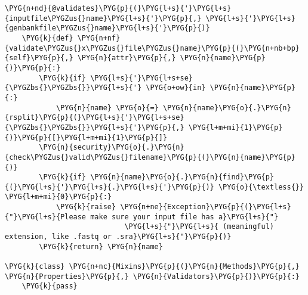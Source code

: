 \begin{Verbatim}[commandchars=\\\{\}]
    \PYG{n+nd}{@validates}\PYG{p}{(}\PYG{l+s}{'}\PYG{l+s}{inputfile\PYGZus{}name}\PYG{l+s}{'}\PYG{p}{,} \PYG{l+s}{'}\PYG{l+s}{genbankfile\PYGZus{}name}\PYG{l+s}{'}\PYG{p}{)}
    \PYG{k}{def} \PYG{n+nf}{validate\PYGZus{}x\PYGZus{}file\PYGZus{}name}\PYG{p}{(}\PYG{n+nb+bp}{self}\PYG{p}{,} \PYG{n}{attr}\PYG{p}{,} \PYG{n}{name}\PYG{p}{)}\PYG{p}{:}
        \PYG{k}{if} \PYG{l+s}{'}\PYG{l+s+se}{\PYGZbs{}\PYGZbs{}}\PYG{l+s}{'} \PYG{o+ow}{in} \PYG{n}{name}\PYG{p}{:}
            \PYG{n}{name} \PYG{o}{=} \PYG{n}{name}\PYG{o}{.}\PYG{n}{rsplit}\PYG{p}{(}\PYG{l+s}{'}\PYG{l+s+se}{\PYGZbs{}\PYGZbs{}}\PYG{l+s}{'}\PYG{p}{,} \PYG{l+m+mi}{1}\PYG{p}{)}\PYG{p}{[}\PYG{l+m+mi}{1}\PYG{p}{]}
        \PYG{n}{security}\PYG{o}{.}\PYG{n}{check\PYGZus{}valid\PYGZus{}filename}\PYG{p}{(}\PYG{n}{name}\PYG{p}{)}
        \PYG{k}{if} \PYG{n}{name}\PYG{o}{.}\PYG{n}{find}\PYG{p}{(}\PYG{l+s}{'}\PYG{l+s}{.}\PYG{l+s}{'}\PYG{p}{)} \PYG{o}{\textless{}} \PYG{l+m+mi}{0}\PYG{p}{:}
            \PYG{k}{raise} \PYG{n+ne}{Exception}\PYG{p}{(}\PYG{l+s}{"}\PYG{l+s}{Please make sure your input file has a}\PYG{l+s}{"}
                            \PYG{l+s}{"}\PYG{l+s}{ (meaningful) extension, like .fastq or .sra}\PYG{l+s}{"}\PYG{p}{)}
        \PYG{k}{return} \PYG{n}{name}

\PYG{k}{class} \PYG{n+nc}{Mixins}\PYG{p}{(}\PYG{n}{Methods}\PYG{p}{,} \PYG{n}{Properties}\PYG{p}{,} \PYG{n}{Validators}\PYG{p}{)}\PYG{p}{:}
    \PYG{k}{pass}
\end{Verbatim}


